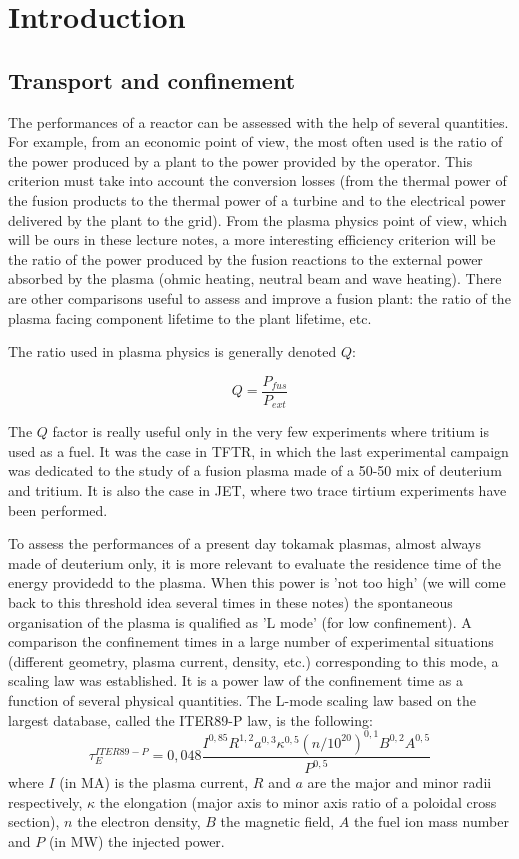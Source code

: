 \chapter{Introduction}
\label{chap:Introduction}

		\section{Transport and confinement}
		\label{sec:TransportEtConfinement}

The performances of a reactor can be assessed with the help of several quantities. For example, from an economic point of view, the most often used is the ratio of the power produced by a plant to the power provided by the operator. This criterion must take into account the conversion losses (from the thermal power of the fusion products to the thermal power of a turbine and to the electrical power delivered by the plant to the grid). From the plasma physics point of view, which will be ours in these lecture notes, a more interesting efficiency criterion will be the ratio of the power produced by the fusion reactions to the external power absorbed by the plasma (ohmic heating, neutral beam and wave heating). There are other comparisons useful to assess and improve a fusion plant: the ratio of the plasma facing component lifetime to the plant lifetime, etc.

The ratio used in plasma physics is generally denoted $Q$:

\[
Q = \frac{P_{fus}}{P_{ext}}
\]

The $Q$ factor is really useful only in the very few experiments where tritium is used as a fuel. It was the case in TFTR, in which the last experimental campaign was dedicated to the study of a fusion plasma made of a 50-50 mix of deuterium and tritium. It is also the case in JET, where two trace tirtium experiments have been performed.

To assess the performances of a present day tokamak plasmas, almost always made of deuterium only, it is more relevant to evaluate the residence time of the energy providedd to the plasma. When this power is 'not too high' (we will come back to this threshold idea several times in these notes) the spontaneous organisation of the plasma is qualified as 'L mode' (for low confinement). A comparison the confinement times in a large number of experimental situations (different geometry, plasma current, density, etc.) corresponding to this mode, a scaling law was established. It is a power law of the confinement time as a function of several physical quantities. The L-mode scaling law based on the largest database, called the ITER89-P law, is the following:
\[
\tau_E^{ITER89-P} = 0,048 \frac{I^{0,85}R^{1,2}a^{0,3}\kappa^{0,5}(n/10^{20})^{0,1}B^{0,2}A^{0,5}}{P^{0,5}}
\]
where $I$ (in MA) is the plasma current, $R$ and $a$ are the major and minor radii respectively, $\kappa$ the elongation (major axis to minor axis ratio of a poloidal cross section), $n$ the electron density, $B$ the magnetic field, $A$ the fuel ion mass number and $P$ (in MW) the injected power.

